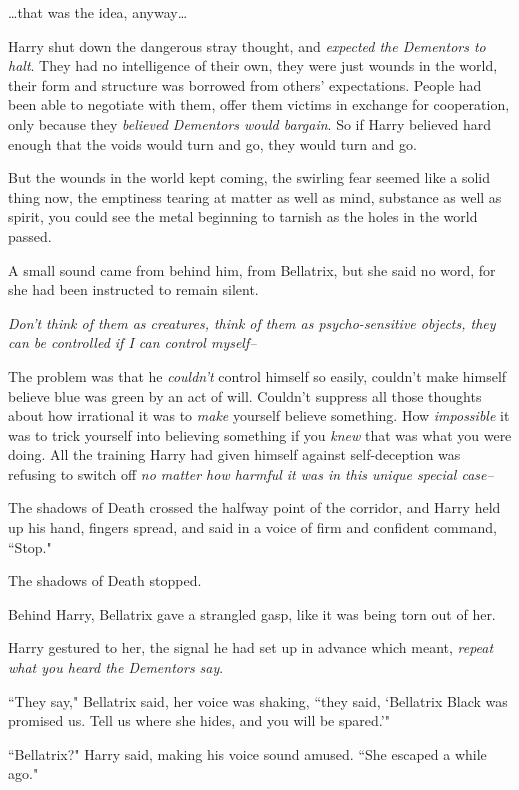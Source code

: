 {\ldots}that was the idea, anyway{\ldots}

Harry shut down the dangerous stray thought, and \emph{expected the Dementors to halt}. They had no intelligence of their own, they were just wounds in the world, their form and structure was borrowed from others' expectations. People had been able to negotiate with them, offer them victims in exchange for cooperation, only because they \emph{believed Dementors would bargain}. So if Harry believed hard enough that the voids would turn and go, they would turn and go.

But the wounds in the world kept coming, the swirling fear seemed like a solid thing now, the emptiness tearing at matter as well as mind, substance as well as spirit, you could see the metal beginning to tarnish as the holes in the world passed.

A small sound came from behind him, from Bellatrix, but she said no word, for she had been instructed to remain silent.

\emph{Don't think of them as creatures, think of them as psycho-sensitive objects, they can be controlled if I can control myself\---}

The problem was that he \emph{couldn't} control himself so easily, couldn't make himself believe blue was green by an act of will. Couldn't suppress all those thoughts about how irrational it was to \emph{make} yourself believe something. How \emph{impossible} it was to trick yourself into believing something if you \emph{knew} that was what you were doing. All the training Harry had given himself against self-deception was refusing to switch off \emph{no matter how harmful it was in this unique special case\---}

The shadows of Death crossed the halfway point of the corridor, and Harry held up his hand, fingers spread, and said in a voice of firm and confident command, ``Stop."

The shadows of Death stopped.

Behind Harry, Bellatrix gave a strangled gasp, like it was being torn out of her.

Harry gestured to her, the signal he had set up in advance which meant, \emph{repeat what you heard the Dementors say}.

``They say," Bellatrix said, her voice was shaking, ``they said, `Bellatrix Black was promised us. Tell us where she hides, and you will be spared.'"

``Bellatrix?" Harry said, making his voice sound amused. ``She escaped a while ago."

